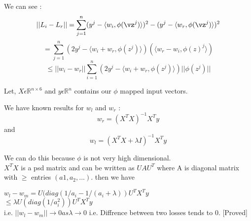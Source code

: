 \documentclass[a4paper,11pt]{article}
\begin{document}
\begin{mlsolution}

We can see : $$|| L_i - L_r || = \sum_{j=1}^{n}(y^j - \langle w_i,\phi(\vz^j)\rangle)^2 - (y^j - \langle w_r,\phi(\vz^j)\rangle)^2$$ $$ = \sum_{j=1}^{n}(2y^j - \langle w_i + w_r,\phi(z^j)\rangle)(\langle w_r - w_i,\phi(z)^j \rangle)$$ 
$$\leq ||w_i - w_r||\sum_{i=1}^{n}(2y^j - \langle w_i + w_r,\phi(z^j)\rangle)||\phi(z^j)||$$

Let, $X \epsilon \mathbb{R}^{n \times 6}$ and $y \epsilon \mathbb{R}^n$ contains our $\phi$ mapped input vectors.  

We have known results for $w_l$ and $w_r$ : $$w_r = (X^{T}X)^{-1}X^Ty$$ and $$w_l = (X^TX + \lambda I)^{-1}X^Ty$$

We can do this because $\phi$ is not very high dimensional.\\
$X^TX$ is a psd matrix and can be written as $UAU^T$ where A is diagonal matrix with  $\geq$ entries $(a1,a_2,...)$. then we have \\
\begin{center}
$w_l - w_m = U(diag(1/a_i - 1/(a_i + \lambda))U^TX^Ty$ \\
$\leq \lambda U(diag(1/a_i^2))U^T X^Ty$\\ i.e. $||w_l - w_m|| \rightarrow 0 as \lambda \rightarrow 0$ i.e. Diffrence between two losses tends to 0. [Proved]
\end{center}
\end{mlsolution}
\end{document}
